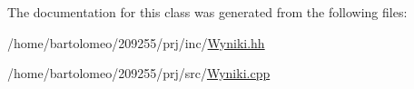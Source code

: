 The documentation for this class was generated from the following files\-:\begin{DoxyCompactItemize}
\item 
/home/bartolomeo/209255/prj/inc/\hyperlink{_wyniki_8hh}{Wyniki.\-hh}\item 
/home/bartolomeo/209255/prj/src/\hyperlink{_wyniki_8cpp}{Wyniki.\-cpp}\end{DoxyCompactItemize}

